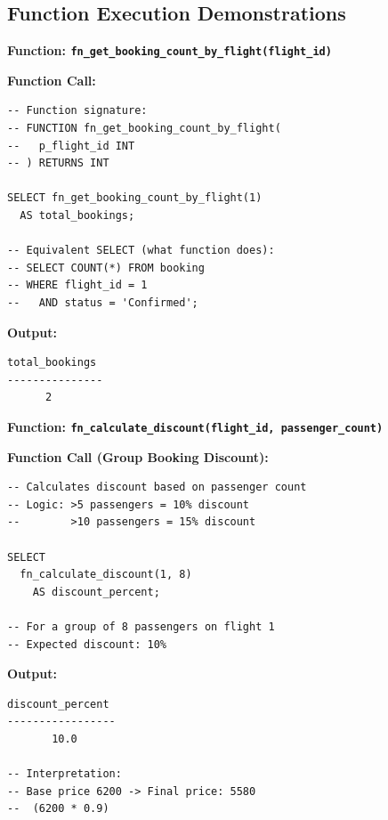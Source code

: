 \documentclass[12pt, a4paper]{article}
\begin{document}
\subsection{Function Execution Demonstrations}

\textbf{Function: \texttt{fn\_get\_booking\_count\_by\_flight(flight\_id)}}

\noindent\begin{minipage}[t]{0.48\textwidth}
\textbf{Function Call:}
\begin{lstlisting}[style=sqlstyle,basicstyle=\tiny\ttfamily,showstringspaces=false]
-- Function signature:
-- FUNCTION fn_get_booking_count_by_flight(
--   p_flight_id INT
-- ) RETURNS INT

SELECT fn_get_booking_count_by_flight(1) 
  AS total_bookings;

-- Equivalent SELECT (what function does):
-- SELECT COUNT(*) FROM booking 
-- WHERE flight_id = 1 
--   AND status = 'Confirmed';
\end{lstlisting}
\end{minipage}\hfill
\begin{minipage}[t]{0.48\textwidth}
\textbf{Output:}
\begin{lstlisting}[style=sqlstyle,basicstyle=\tiny\ttfamily,showstringspaces=false]
total_bookings
---------------
      2
\end{lstlisting}
\end{minipage}

\vspace{0.3cm}

\textbf{Function: \texttt{fn\_calculate\_discount(flight\_id, passenger\_count)}}

\noindent\begin{minipage}[t]{0.48\textwidth}
\textbf{Function Call (Group Booking Discount):}
\begin{lstlisting}[style=sqlstyle,basicstyle=\tiny\ttfamily,showstringspaces=false]
-- Calculates discount based on passenger count
-- Logic: >5 passengers = 10% discount
--        >10 passengers = 15% discount

SELECT 
  fn_calculate_discount(1, 8) 
    AS discount_percent;

-- For a group of 8 passengers on flight 1
-- Expected discount: 10%
\end{lstlisting}
\end{minipage}\hfill
\begin{minipage}[t]{0.48\textwidth}
\textbf{Output:}
\begin{lstlisting}[style=sqlstyle,basicstyle=\tiny\ttfamily,showstringspaces=false]
discount_percent
-----------------
       10.0

-- Interpretation:
-- Base price 6200 -> Final price: 5580
--  (6200 * 0.9)
\end{lstlisting}
\end{minipage}
\end{document}

